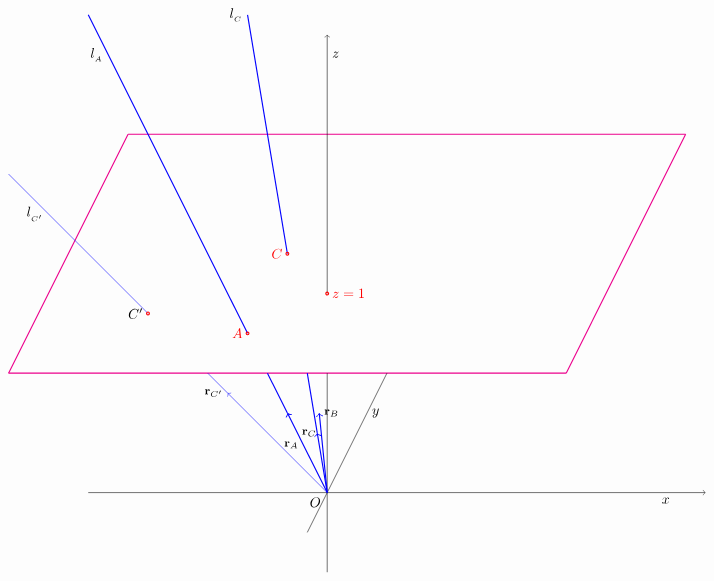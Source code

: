 \documentclass[12pt]{article}
\numberwithin{equation}{section}
\begin{document}
\begin{equation}\label{collinearpoints}
\begin{tikzpicture}



\draw [   magenta, thick] (-10,-2)--(4,-2);
\draw [   magenta, thick] (-10,-2)--(-7,4);
\draw [   magenta, thick] (-7,4)--(7,4);
\draw [   magenta, thick] (4,-2)--(7,4);

\node [below] at (-2.3,-5) {$O$};

\draw [ -> , thin] (-8,-5)--(7.5,-5);
\node [below] at (6.5,-5) {$x$};
\draw [  thin] (-2,-7)--(-2,-2);
\draw [ -> , thin] (-2,0)--(-2,6.5);
\node [right] at (-2,6) {$z$};
\draw [ thin] (-2.5,-6)--(-0.5,-2);
\node [right] at (-1,-3) {$y$};



\draw [red, thick] (-2,0) circle (1pt);
\node [right,red] at (-2,0) {$z=1$};


\draw [blue, thick,->] (-2,-5)--(-3,-3);
\node [left] at (-2.6,-3.8) {$\hbox{\footnotesize $\r_A$}$};

\draw [blue, thick] (-3,-3)--(-3.5,-2);

\draw [blue, thick] (-4,-1)--(-8,7);
\node [left] at (-7.5,6) {$l_{_A}$};
\draw [red, thick] (-4,-1) circle (1pt);
\node [left,red] at (-4,-1) {$A$};


\draw [blue, thick,->] (-2,-5)--(-2.25,-3.5);
\node [left] at (-2.15,-3.5) {$\hbox{\footnotesize $\r_C$}$};

\draw [blue, thick] (-2.25,-3.5)--(-2.5,-2);
\draw [blue, thick] (-3,1)--(-4,7);
\node [left] at (-4,7) {$l_{_C}$};
\draw [red, thick] (-3,1) circle (1pt);
\node [left,red] at (-3,1) {$C$};
      
\draw [blue, thin,->] (-2,-5)--(-4.5,-2.5);
\node [left] at (-4.5,-2.5) {$\hbox{\footnotesize $\r_{C'}$}$};

\draw [blue, thin] (-4.5,-2.5)--(-5,-2);
\draw [blue, thin] (-6.5,-0.5)--(-10,3);
\node [left] at (-9,2) {$l_{_{C'}}$};
\draw [red, thick] (-6.5,-0.5) circle (1pt);
\node [left] at (-6.5,-0.5) {$C'$};
 
\draw [blue, thick,->] (-2,-5)--(-2.2,-3);
\node [right] at (-2.2,-3) {$\hbox{\footnotesize $\r_B$}$};


\end{tikzpicture}
\end{equation}
\end{document}
